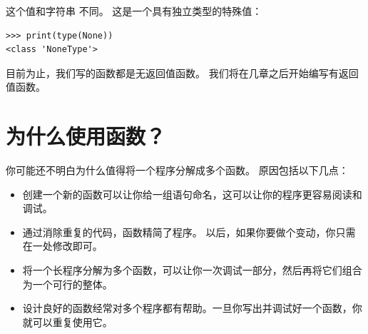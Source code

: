 这个值和字符串  不同。 这是一个具有独立类型的特殊值：

\begin{lstlisting}
>>> print(type(None))
<class 'NoneType'>
\end{lstlisting}

%

目前为止，我们写的函数都是无返回值函数。
我们将在几章之后开始编写有返回值函数。
  


%
\section{为什么使用函数？}



你可能还不明白为什么值得将一个程序分解成多个函数。 原因包括以下几点：

\begin{itemize}

\item 创建一个新的函数可以让你给一组语句命名，这可以让你的程序更容易阅读和调试。

\item 通过消除重复的代码，函数精简了程序。 以后，如果你要做个变动，你只需在一处修改即可。

\item 将一个长程序分解为多个函数，可以让你一次调试一部分，然后再将它们组合为一个可行的整体。

\item 设计良好的函数经常对多个程序都有帮助。一旦你写出并调试好一个函数，你就可以重复使用它。

\end{itemize}


